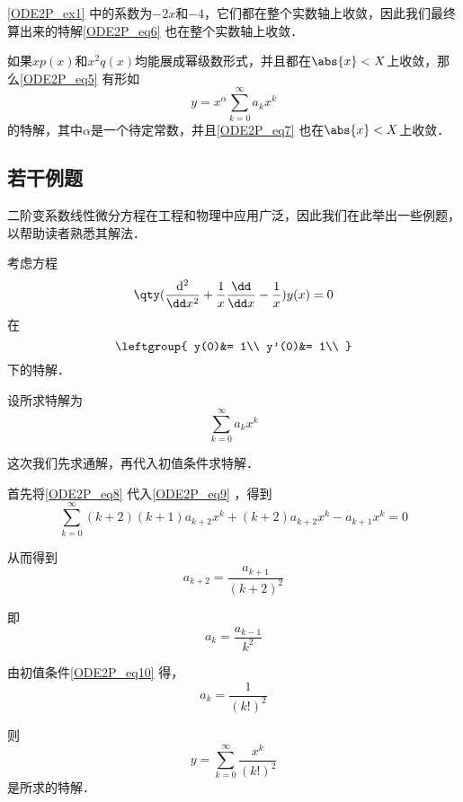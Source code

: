 \autoref{ODE2P_ex1} 中的系数为$-2x$和$-4$，它们都在整个实数轴上收敛，因此我们最终算出来的特解\autoref{ODE2P_eq6} 也在整个实数轴上收敛．

\begin{theorem}{}\label{ODE2P_the1}
如果$xp(x)$和$x^2q(x)$均能展成幂级数形式，并且都在$\abs{x}<X$上收敛，那么\autoref{ODE2P_eq5} 有形如
\begin{equation}\label{ODE2P_eq7}
y=x^\alpha\sum\limits_{k=0}^\infty a_kx^k
\end{equation}
的特解，其中$\alpha$是一个待定常数，并且\autoref{ODE2P_eq7} 也在$\abs{x}<X$上收敛．


\end{theorem}


\subsection{若干例题}

二阶变系数线性微分方程在工程和物理中应用广泛，因此我们在此举出一些例题，以帮助读者熟悉其解法．

\begin{example}{}\label{ODE2P_ex2}
考虑方程
\begin{equation}\label{ODE2P_eq9}
\qty(\frac{\mathrm{d}^2}{\dd x^2}+\frac{1}{x}\frac{\dd}{\dd x}-\frac{1}{x})y(x)=0
\end{equation}
在
\begin{equation}\label{ODE2P_eq10}
\leftgroup{
    y(0)&= 1\\
    y'(0)&= 1\\
}
\end{equation}
下的特解．

设所求特解为
\begin{equation}\label{ODE2P_eq8}
\sum\limits_{k=0}^\infty a_kx^k
\end{equation}

这次我们先求通解，再代入初值条件求特解．

首先将\autoref{ODE2P_eq8} 代入\autoref{ODE2P_eq9} ，得到
\begin{equation}
\sum\limits_{k=0}^\infty (k+2)(k+1)a_{k+2}x^k+(k+2)a_{k+2}x^k-a_{k+1}x^k=0
\end{equation}

从而得到
\begin{equation}
a_{k+2}=\frac{a_{k+1}}{(k+2)^2}
\end{equation}

即
\begin{equation}\label{ODE2P_eq11}
a_k=\frac{a_{k-1}}{k^2}
\end{equation}

由初值条件\autoref{ODE2P_eq10} 得，
\begin{equation}
a_k=\frac{1}{(k!)^2}
\end{equation}

则
\begin{equation}
y=\sum\limits_{k=0}^\infty \frac{x^k}{(k!)^2}
\end{equation}
是所求的特解．


\end{example}


